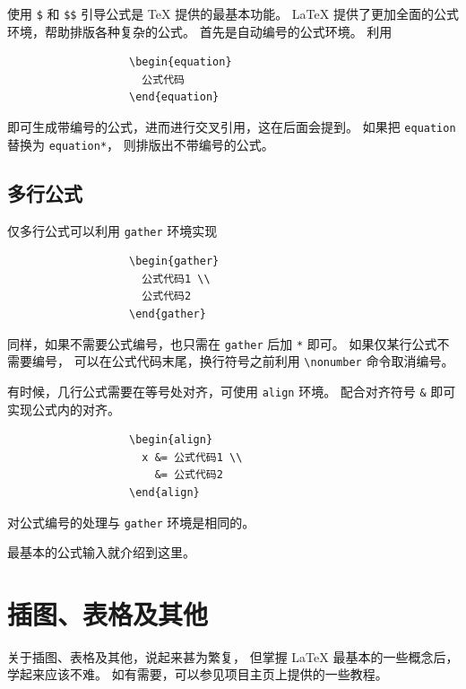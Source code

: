 使用 \verb|$| 和 \verb|$$| 引导公式是 \TeX{} 提供的最基本功能。
\LaTeX{} 提供了更加全面的公式环境，帮助排版各种复杂的公式。
首先是自动编号的公式环境。
利用

{%
\begin{verbatim}
                   \begin{equation}
                     公式代码
                   \end{equation}
\end{verbatim}}

\vspace{-0.4em}\noindent
即可生成带编号的公式，进而进行交叉引用，这在后面会提到。
如果把 \verb|equation| 替换为 \verb|equation*|，
则排版出不带编号的公式。


\subsection{多行公式}

仅多行公式可以利用 \verb|gather| 环境实现

{
\begin{verbatim}
                   \begin{gather}
                     公式代码1 \\
                     公式代码2
                   \end{gather}
\end{verbatim}}

\vspace{-0.4em}\noindent
同样，如果不需要公式编号，也只需在 \verb|gather| 后加 \verb|*| 即可。
如果仅某行公式不需要编号，
可以在公式代码末尾，换行符号之前利用 \verb|\nonumber| 命令取消编号。

有时候，几行公式需要在等号处对齐，可使用 \verb|align| 环境。
配合对齐符号 \verb|&| 即可实现公式内的对齐。
{
\begin{verbatim}
                   \begin{align}
                     x &= 公式代码1 \\
                       &= 公式代码2
                   \end{align}
\end{verbatim}}

\vspace{-0.4em}\noindent
对公式编号的处理与 \verb|gather| 环境是相同的。

最基本的公式输入就介绍到这里。


\section{插图、表格及其他}

关于插图、表格及其他，说起来甚为繁复，
但掌握 \LaTeX{} 最基本的一些概念后，学起来应该不难。
如有需要，可以参见项目主页上提供的一些教程。

